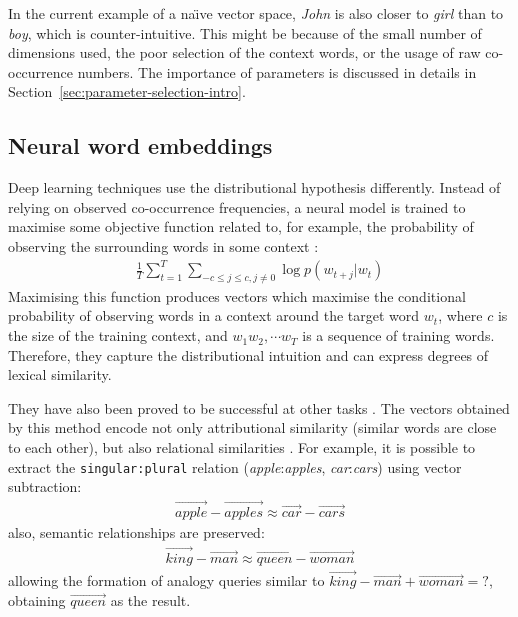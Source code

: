 In the current example of a na{\"\i}ve vector space, \textit{John} is also closer to \textit{girl} than to \textit{boy}, which is counter-intuitive. This might be because of the small number of dimensions used, the poor selection of the context words, or the usage of raw co-occurrence numbers. The importance of parameters is discussed in details in Section~\ref{sec:parameter-selection-intro}.

\subsection{Neural word embeddings}
\label{sec:neural-embedding}

Deep learning techniques use the distributional hypothesis differently. Instead of relying on observed co-occurrence frequencies, a neural model is trained to maximise some objective function related to, for example, the probability of observing the surrounding words in some context \cite{mikolov2013distributed}:
%
%
%
%
\begin{align}
 \frac{1}{T}\sum^{T}_{t=1}\sum_{-c \leq j \leq c, j\neq0} \log p(w_{t+j}|w_t)
  \label{eq:objective-func}
\end{align}
%
\noindent
Maximising this function produces vectors which maximise the
conditional probability of observing words in a context around the
target word $w_t$, where $c$ is the size of the training context, and
$w_1 w_2, \cdots w_T$ is a sequence of training words. Therefore, they
capture the distributional intuition and can express degrees of
lexical similarity.

They have also been proved to be successful at other tasks \cite{mikolov2013linguistic}. The vectors obtained by this method encode not only attributional similarity (similar words are close to each other), but also relational similarities \cite{Turney:2010:FMV:1861751.1861756}. For example, it is possible to extract the \texttt{singular:plural} relation (\textit{apple}:\textit{apples}, \textit{car}:\textit{cars}) using vector subtraction:
%
\begin{align*}
  \overrightarrow{\mathit{apple}} - \overrightarrow{\mathit{apples}}
  \approx
  \overrightarrow{\mathit{car}} - \overrightarrow{\mathit{cars}}
\end{align*}
%
also, semantic relationships are preserved:
%
\begin{align*}
  \overrightarrow{\mathit{king}} - \overrightarrow{\mathit{man}}
  \approx
  \overrightarrow{\mathit{queen}} - \overrightarrow{\mathit{woman}}
\end{align*}
%
allowing the formation of analogy queries similar to
$\overrightarrow{\mathit{king}} - \overrightarrow{\mathit{man}} +
\overrightarrow{\mathit{woman}} = \mathtt{?}$, obtaining
$\overrightarrow{\mathit{queen}}$ as the
result.

